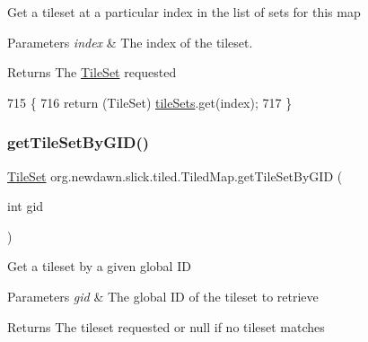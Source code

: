 Get a tileset at a particular index in the list of sets for this map


\begin{DoxyParams}{Parameters}
{\em index} & The index of the tileset. \\
\hline
\end{DoxyParams}
\begin{DoxyReturn}{Returns}
The \mbox{\hyperlink{classorg_1_1newdawn_1_1slick_1_1tiled_1_1_tile_set}{Tile\+Set}} requested 
\end{DoxyReturn}

\begin{DoxyCode}
715                                          \{
716         \textcolor{keywordflow}{return} (TileSet) \mbox{\hyperlink{classorg_1_1newdawn_1_1slick_1_1tiled_1_1_tiled_map_a4fd72e23a7aaf6f85905f4bf78e2ce5f}{tileSets}}.get(index);
717     \}
\end{DoxyCode}
\mbox{\label{classorg_1_1newdawn_1_1slick_1_1tiled_1_1_tiled_map_acc1970d3267b2e382887f081242a8979}} 
\subsubsection{\texorpdfstring{get\+Tile\+Set\+By\+G\+I\+D()}{getTileSetByGID()}}
{\footnotesize\ttfamily \mbox{\hyperlink{classorg_1_1newdawn_1_1slick_1_1tiled_1_1_tile_set}{Tile\+Set}} org.\+newdawn.\+slick.\+tiled.\+Tiled\+Map.\+get\+Tile\+Set\+By\+G\+ID (\begin{DoxyParamCaption}\item[{int}]{gid }\end{DoxyParamCaption})\hspace{0.3cm}{\ttfamily [inline]}}

Get a tileset by a given global ID


\begin{DoxyParams}{Parameters}
{\em gid} & The global ID of the tileset to retrieve \\
\hline
\end{DoxyParams}
\begin{DoxyReturn}{Returns}
The tileset requested or null if no tileset matches 
\end{DoxyReturn}

